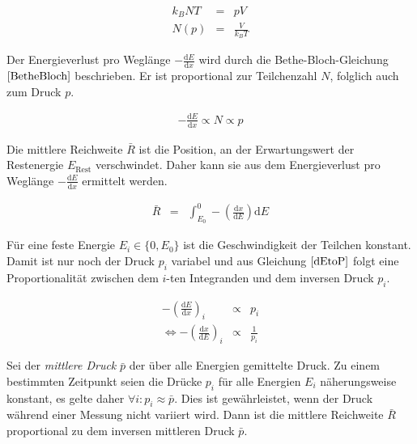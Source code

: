 \documentclass[12pt,a4paper]{scrartcl}
\numberwithin{equation}{section} %
\begin{document}
\begin{eqnarray}
    k_B N T &=& pV \label{iGG} \\
    N(p) &=& \frac{V}{k_B T}
\end{eqnarray}

Der Energieverlust pro Weglänge $-\frac{\mathrm dE}{\mathrm dx}$ wird durch die Bethe-Bloch-Gleichung $\eqref{BetheBloch}$ beschrieben. Er ist proportional zur Teilchenzahl $N$, folglich auch zum Druck $p$.

\begin{eqnarray}
    -\frac{\mathrm dE}{\mathrm dx}\propto N\propto p \label{dEtoP}
\end{eqnarray}

Die mittlere Reichweite $\bar R$ ist die Position, an der Erwartungswert der Restenergie $E_\mathrm{Rest}$ verschwindet. Daher kann sie aus dem Energieverlust pro Weglänge $-\frac{\mathrm dE}{\mathrm dx}$ ermittelt werden.

\begin{eqnarray}
    \bar{R} &=&
        \int_{E_0}^{0} -\left(\frac{\mathrm dx}{\mathrm dE}\right) \mathrm dE
\end{eqnarray}

Für eine feste Energie $E_i \in \{0, E_0\}$ ist die Geschwindigkeit der Teilchen konstant. Damit ist nur noch der Druck $p_i$ variabel und aus Gleichung $\eqref{dEtoP}$ folgt eine Proportionalität zwischen dem $i$-ten Integranden und dem inversen Druck $p_i$.

\begin{eqnarray}
    -\left(\frac{\mathrm dE}{\mathrm dx}\right)_i &\propto& p_i \\
    \Leftrightarrow -\left(\frac{\mathrm dx}{\mathrm dE}\right)_i
        &\propto& \frac{1}{p_i}
\end{eqnarray}

Sei der \emph{mittlere Druck} $\bar p$ der über alle Energien gemittelte Druck. Zu einem bestimmten Zeitpunkt seien die Drücke $p_i$ für alle Energien $E_i$ näherungsweise konstant, es gelte daher $\forall i: p_i \approx \bar p$. Dies ist gewährleistet, wenn der Druck während einer Messung nicht variiert wird. Dann ist die mittlere Reichweite $\bar R$ proportional zu dem inversen mittleren Druck $\bar p$.
\end{document}
